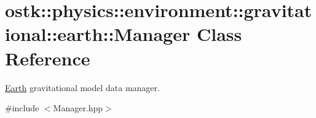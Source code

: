 \hypertarget{classostk_1_1physics_1_1environment_1_1gravitational_1_1earth_1_1_manager}{}\section{ostk\+:\+:physics\+:\+:environment\+:\+:gravitational\+:\+:earth\+:\+:Manager Class Reference}
\label{classostk_1_1physics_1_1environment_1_1gravitational_1_1earth_1_1_manager}


\hyperlink{classostk_1_1physics_1_1environment_1_1gravitational_1_1_earth}{Earth} gravitational model data manager.  




{\ttfamily \#include $<$Manager.\+hpp$>$}

